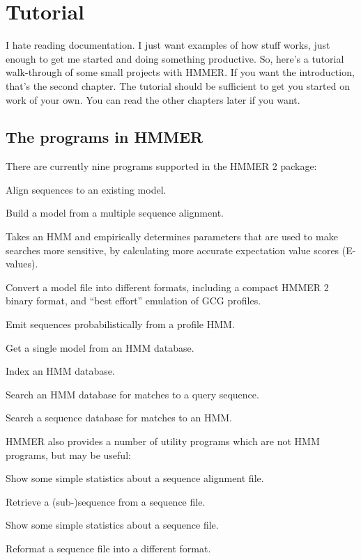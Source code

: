 \chapter{Tutorial}

I hate reading documentation. I just want examples of how stuff works,
just enough to get me started and doing something productive. So,
here's a tutorial walk-through of some small projects with HMMER. If
you want the introduction, that's the second chapter. The tutorial
should be sufficient to get you started on work of your own. You can
read the other chapters later if you want.

\section {The programs in HMMER}

There are currently nine programs supported in the HMMER 2 package:

\begin{wideitem}
\item[\emprog{hmmalign}] Align sequences to an existing model.
\item[\emprog{hmmbuild}] Build a model from a multiple sequence alignment.
\item[\emprog{hmmcalibrate}] Takes an HMM and empirically determines
parameters that are used to make searches more sensitive, by
calculating more accurate expectation value scores (E-values).
\item[\emprog{hmmconvert}] Convert a model file into different formats,
including a compact HMMER 2 binary format, and ``best effort''
emulation of GCG profiles.
\item[\emprog{hmmemit}] Emit sequences probabilistically from a profile HMM.
\item[\emprog{hmmfetch}] Get a single model from an HMM database.
\item[\emprog{hmmindex}] Index an HMM database.
\item[\emprog{hmmpfam}] Search an HMM database for matches to a query sequence.
\item[\emprog{hmmsearch}] Search a sequence database for matches to an HMM.
\end{wideitem}

HMMER also provides a number of utility programs which are not HMM
programs, but may be useful:

\begin{wideitem}
\item[\emprog{alistat}] Show some simple statistics about a sequence
alignment file.
\item[\emprog{sfetch}] Retrieve a (sub-)sequence from a sequence file.
\item[\emprog{seqstat}] Show some simple statistics about a sequence file.
\item[\emprog{sreformat}] Reformat a sequence file into a different format.
\end{wideitem}

